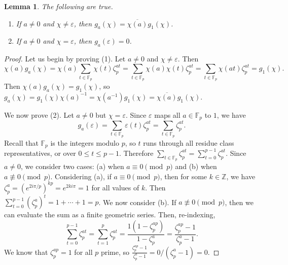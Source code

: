 \documentclass[10pt]{amsart}
\newcommand{\eps}{\varepsilon}
\theoremstyle{plain}
\newtheorem{lemma}[thm]{Lemma}
\theoremstyle{definition}
\theoremstyle{remark}
\numberwithin{equation}{section}
\begin{document}
\begin{lemma} \label{Lemma: two properties of the Gauss sum}
The following are true. 
    \begin{enumerate}
        \item If $a\neq 0$ and $\chi\neq \eps$, then $g_{a}(\chi)=\overline{\chi(a)}g_{1}(\chi)$. 
        \item If $a\neq 0$ and $\chi = \eps$, then $g_{a}(\eps)=0$.
    \end{enumerate}
\end{lemma}
\begin{proof}
    Let us begin by proving (1). Let $a\neq 0$ and $\chi\neq \eps$. Then 
    \begin{equation*}
        \chi(a)g_{a}(\chi) = \chi(a)\sum_{t\in\mathbb{F}_{p}}\chi(t)\zeta_{p}^{at} = \sum_{t\in\mathbb{F}_{p}}\chi(a)\chi(t)\zeta_{p}^{at} = \sum_{t\in\mathbb{F}_{p}}\chi(at)\zeta_{p}^{at} = g_{1}(\chi).
    \end{equation*}
    Then $\chi(a)g_{a}(\chi) = g_{1}(\chi)$, so $g_{a}(\chi)=g_{1}(\chi)\chi(a)^{-1} = \chi(a^{-1})g_{1}(\chi) = \overline{\chi(a)}g_{1}(\chi)$. 
    
    \indent We now prove (2). Let $a\neq 0$ but $\chi=\eps$. Since $\eps$ maps all $a\in\mathbb{F}_{p}$ to $1$, we have 
    \begin{equation*}
        g_{a}(\eps) = \sum_{t\in\mathbb{F}_{p}}\eps(t)\zeta_{p}^{at} = \sum_{t\in\mathbb{F}_{p}}\zeta_{p}^{at}.
    \end{equation*}
    Recall that $\mathbb{F}_{p}$ is the integers modulo $p$, so $t$ runs through all residue class representatives, or over $0\leq t\leq p-1$. Therefore $\sum_{t\in\mathbb{F}_{p}}\zeta_{p}^{at} = \sum_{t=0}^{p-1}\zeta_{p}^{at}$. Since $a\neq 0$, we consider two cases: (a) when $a\equiv 0 \pmod{p}$ and (b) when $a\not\equiv 0\pmod{p}$. Considering (a), if $a\equiv 0 \pmod{p}$, then for some $k\in\mathbb{Z}$, we have $\zeta_{p}^{a} = (e^{2i\pi/p})^{kp} = e^{2ki\pi}=1$ for all values of $k$. Then $\sum_{t=0}^{p-1}(\zeta_{p}^{a})^{t}=1+\cdots+1=p$. We now consider (b). If $a\not\equiv 0\pmod{p}$, then we can evaluate the sum as a finite geometric series. Then, re-indexing, 
    \begin{equation*}
        \sum_{t=0}^{p-1}\zeta_{p}^{at} = \sum_{t=1}^{p}\zeta_{p}^{at} = \frac{1(1-\zeta_{p}^{ap})}{1-\zeta_{p}^{a}} = \frac{\zeta_{p}^{ap}-1}{\zeta_{p}^{a}-1}.
    \end{equation*}
    We know that $\zeta_{p}^{ap}=1$ for all $p$ prime, so $\frac{\zeta_{p}^{ap}-1}{\zeta_{p}^{a}-1}=0/(\zeta_{p}^{a}-1)=0$. 
\end{proof}
\end{document}
